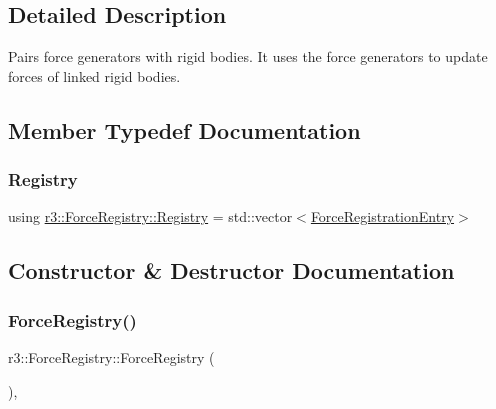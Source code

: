 \subsection{Detailed Description}
Pairs force generators with rigid bodies. It uses the force generators to update forces of linked rigid bodies. 

\subsection{Member Typedef Documentation}
\mbox{\label{classr3_1_1_force_registry_a91449a71b1a33d773ef787ae56ae9b2d}} 
\subsubsection{\texorpdfstring{Registry}{Registry}}
{\footnotesize\ttfamily using \mbox{\hyperlink{classr3_1_1_force_registry_a91449a71b1a33d773ef787ae56ae9b2d}{r3\+::\+Force\+Registry\+::\+Registry}} =  std\+::vector$<$\mbox{\hyperlink{structr3_1_1_force_registry_1_1_force_registration_entry}{Force\+Registration\+Entry}}$>$}



\subsection{Constructor \& Destructor Documentation}
\mbox{\label{classr3_1_1_force_registry_a6830132c53a756ebf3e6621195f51b17}} 
\subsubsection{\texorpdfstring{Force\+Registry()}{ForceRegistry()}}
{\footnotesize\ttfamily r3\+::\+Force\+Registry\+::\+Force\+Registry (\begin{DoxyParamCaption}{ }\end{DoxyParamCaption})\hspace{0.3cm}{\ttfamily [explicit]}, {\ttfamily [default]}}

\mbox{\label{classr3_1_1_force_registry_a322cdf54468a6f59610562a7bfc2e60d}} 
